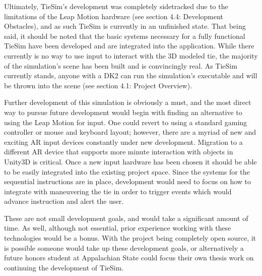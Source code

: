 Ultimately, TieSim's development was completely sidetracked due to the limitations of the Leap Motion hardware (see section 4.4: Development Obstacles), and as such TieSim is currently in an unfinished state. That being said, it should be noted that the basic systems necessary for a fully functional TieSim have been developed and are integrated into the application. While there currently is no way to use input to interact with the 3D modeled tie, the majority of the simulation's scene has been built and is convincingly real. As TieSim currently stands, anyone with a DK2 can run the simulation's executable and will be thrown into the scene (see section 4.1: Project Overview). 

Further development of this simulation is obviously a must, and the most direct way to pursue future development would begin with finding an alternative to using the Leap Motion for input. One could revert to using a standard gaming controller or mouse and keyboard layout; however, there are a myriad of new and exciting AR input devices constantly under new development. Migration to a different AR device that supports more minute interaction with objects in Unity3D is critical. Once a new input hardware has been chosen it should be able to be easily integrated into the existing project space. Since the systems for the sequential instructions are in place, development would need to focus on how to integrate with maneuvering the tie in order to trigger events which would advance instruction and alert the user. 

These are not small development goals, and would take a significant amount of time. As well, although not essential, prior experience working with these technologies would be a bonus. With the project being completely open source, it is possible someone would take up these development goals, or alternatively a future honors student at Appalachian State could focus their own thesis work on continuing the development of TieSim.
